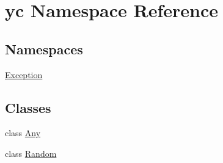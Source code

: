 \hypertarget{namespaceyc}{}\section{yc Namespace Reference}
\label{namespaceyc}
\subsection*{Namespaces}
\begin{DoxyCompactItemize}
\item 
 \hyperlink{namespaceyc_1_1_exception}{Exception}
\end{DoxyCompactItemize}
\subsection*{Classes}
\begin{DoxyCompactItemize}
\item 
class \hyperlink{classyc_1_1_any}{Any}
\item 
class \hyperlink{classyc_1_1_random}{Random}
\end{DoxyCompactItemize}
